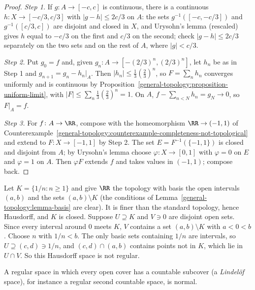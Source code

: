 \begin{proof}
\emph{Step 1.} If $g \colon A \to [-c, c]$ is continuous, there is a continuous $h \colon X \to [-c/3, c/3]$ with $|g - h| \leq 2c/3$ on $A$: the sets
$g^{-1}([-c, -c/3])$ and $g^{-1}([c/3, c])$ are disjoint and closed in $X$, and Urysohn's lemma (rescaled) gives $h$ equal to $-c/3$ on the first and
$c/3$ on the second; check $|g - h| \leq 2c/3$ separately on the two sets and on the rest of $A$, where $|g| < c/3$.

\emph{Step 2.} Put $g_0 = f$ and, given $g_n \colon A \to [-(2/3)^n, (2/3)^n]$, let $h_n$ be as in Step 1 and $g_{n+1} = g_n - h_n|_A$. Then
$|h_n| \leq \frac{1}{3}(\frac{2}{3})^n$, so $F = \sum_n h_n$ converges uniformly and is continuous by
Proposition~\ref{general-topology:proposition-uniform-limit}, with $|F| \leq \sum_n \frac13(\frac23)^n = 1$. On $A$,
$f - \sum_{n < N} h_n = g_N \to 0$, so $F|_A = f$.

\emph{Step 3.} For $f \colon A \to \RR$, compose with the homeomorphism $\RR \to (-1, 1)$ of
Counterexample~\ref{general-topology:counterexample-completeness-not-topological} and extend to $F \colon X \to [-1, 1]$ by Step 2. The set
$E = F^{-1}(\{-1, 1\})$ is closed and disjoint from $A$; by Urysohn's lemma choose $\varphi \colon X \to [0, 1]$ with $\varphi = 0$ on $E$ and $\varphi = 1$ on
$A$. Then $\varphi F$ extends $f$ and takes values in $(-1, 1)$; compose back.
\end{proof}

\begin{counterexample}\label{general-topology:counterexample-hausdorff-not-regular}
Let $K = \{1/n : n \geq 1\}$ and give $\RR$ the topology with basis the open intervals $(a, b)$ and the sets $(a, b) \setminus K$ (the conditions of
Lemma~\ref{general-topology:lemma-basis} are clear). It is finer than the standard topology, hence Hausdorff, and $K$ is closed. Suppose $U \supseteq K$
and $V \ni 0$ are disjoint open sets. Since every interval around $0$ meets $K$, $V$ contains a set $(a, b) \setminus K$ with $a < 0 < b$. Choose $n$ with
$1/n < b$. The only basic sets containing $1/n$ are intervals, so $U \supseteq (c, d) \ni 1/n$, and $(c, d) \cap (a, b)$ contains points not in $K$, which lie in
$U \cap V$. So this Hausdorff space is not regular.
\end{counterexample}

\begin{lemma}[Tychonoff]\label{general-topology:lemma-regular-lindelof-normal}
A regular space in which every open cover has a countable subcover (a \emph{Lindel\"of} space), for instance a regular second countable space, is normal.
\end{lemma}

